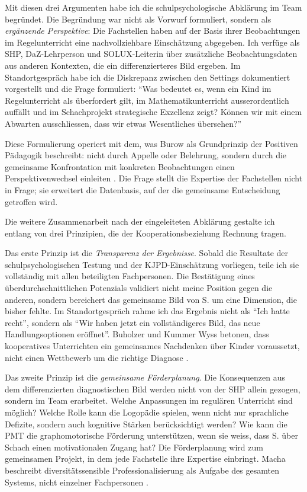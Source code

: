\documentclass[ngerman, a4paper]{article}
\begin{document}
Mit diesen drei Argumenten habe ich die schulpsychologische Abklärung im
Team begründet. Die Begründung war nicht als Vorwurf formuliert, sondern
als \textit{ergänzende Perspektive}: Die Fachstellen haben auf der Basis
ihrer Beobachtungen im Regelunterricht eine nachvollziehbare Einschätzung
abgegeben. Ich verfüge als SHP, DaZ-Lehrperson und SOLUX-Leiterin über
zusätzliche Beobachtungsdaten aus anderen Kontexten, die ein differenzierteres
Bild ergeben. Im Standortgespräch habe ich die Diskrepanz zwischen den
Settings dokumentiert vorgestellt und die Frage formuliert:
\enquote{Was bedeutet es, wenn ein Kind im Regelunterricht als überfordert
gilt, im Mathematikunterricht ausserordentlich auffällt und im Schachprojekt
strategische Exzellenz zeigt? Können wir mit einem Abwarten ausschliessen,
dass wir etwas Wesentliches übersehen?}

Diese Formulierung operiert mit dem, was Burow als Grundprinzip der Positiven
Pädagogik beschreibt: nicht durch Appelle oder Belehrung, sondern durch die
gemeinsame Konfrontation mit konkreten Beobachtungen einen Perspektivenwechsel
einleiten \parencite{burow2021positive}. Die Frage stellt die Expertise der
Fachstellen nicht in Frage; sie erweitert die Datenbasis, auf der die
gemeinsame Entscheidung getroffen wird.

Die weitere Zusammenarbeit nach der eingeleiteten Abklärung gestalte ich
entlang von drei Prinzipien, die der Kooperationsbeziehung Rechnung tragen.

Das erste Prinzip ist die \textit{Transparenz der Ergebnisse}. Sobald die
Resultate der schulpsychologischen Testung und der KJPD-Einschätzung vorliegen,
teile ich sie vollständig mit allen beteiligten Fachpersonen. Die Bestätigung
eines überdurchschnittlichen Potenzials validiert nicht meine Position gegen
die anderen, sondern bereichert das gemeinsame Bild von S. um eine Dimension,
die bisher fehlte. Im Standortgespräch rahme ich das Ergebnis nicht als
\enquote{Ich hatte recht}, sondern als \enquote{Wir haben jetzt ein
vollständigeres Bild, das neue Handlungsoptionen eröffnet}. Buholzer und
Kummer Wyss betonen, dass kooperatives Unterrichten ein gemeinsames
Nachdenken über Kinder voraussetzt, nicht einen Wettbewerb um die
richtige Diagnose \parencite{buholzer2010allegleich}.

Das zweite Prinzip ist die \textit{gemeinsame Förderplanung}. Die
Konsequenzen aus dem differenzierten diagnostischen Bild werden nicht von
der SHP allein gezogen, sondern im Team erarbeitet. Welche Anpassungen
im regulären Unterricht sind möglich? Welche Rolle kann die Logopädie
spielen, wenn nicht nur sprachliche Defizite, sondern auch kognitive
Stärken berücksichtigt werden? Wie kann die PMT die graphomotorische
Förderung unterstützen, wenn sie weiss, dass S. über Schach einen
motivationalen Zugang hat? Die Förderplanung wird zum gemeinsamen Projekt,
in dem jede Fachstelle ihre Expertise einbringt. Macha beschreibt
diversitätssensible Professionalisierung als Aufgabe des gesamten Systems,
nicht einzelner Fachpersonen \parencite{macha2019gender}.
\end{document}
